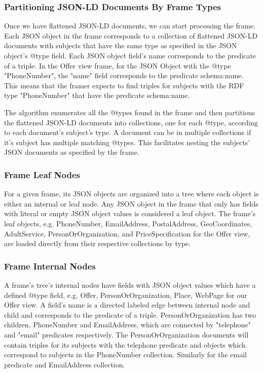 \subsubsection{Partitioning JSON-LD Documents By Frame Types}
Once we have flattened JSON-LD documents, we can start processing the frame. 
Each JSON object in the frame corresponds to a collection of flattened JSON-LD documents with subjects that have the same type as specified in the JSON object's @type field.
Each JSON object field's name corresponds to the predicate of a triple.
In the Offer view frame, for the JSON Object with the @type "PhoneNumber", the "name" field corresponds to the predicate schema:name.
This means that the framer expects to find triples for subjects with the RDF type "PhoneNumber" that have the predicate schema:name.

The algorithm enumerates all the @types found in the frame and then partitions the flattened JSON-LD documents into collections, one for each @type, according to each document's subject's type.
A document can be in multiple collections if it's subject has multiple matching @types.  
This facilitates nesting the subjects' JSON documents as specified by the frame.

\subsubsection{Frame Leaf Nodes}
For a given frame, its JSON objects are organized into a tree where each object is either an internal or leaf node.
Any JSON object in the frame that only has fields with literal or empty JSON object values is considered a leaf object.
The frame's leaf objects, e.g. PhoneNumber, EmailAddress, PostalAddress, GeoCoordinates, AdultService, PersonOrOrganization, and PriceSpecification for the Offer view, are loaded directly from their respective collections by type.

\subsubsection{Frame Internal Nodes}
A frame's tree's internal nodes have fields with JSON object values which have a defined @type field, e.g. Offer, PersonOrOrganization, Place, WebPage for our Offer view.
A field's name is a directed labeled edge between internal node and child and corresponds to the predicate of a triple.
PersonOrOrganization has two children, PhoneNumber and EmailAddress, which are connected by "telephone" and "email" predicates respectively.
The PersonOrOrganization documents will contain triples for its subjects with the telephone predicate and objects which correspond to subjects in the PhoneNumber collection.
Similarly for the email predicate and EmailAddress collection.

